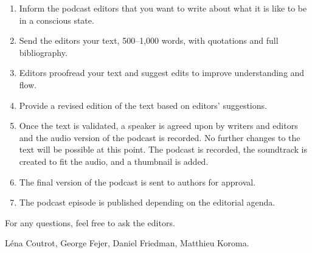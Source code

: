 \documentclass[11pt]{article}
\begin{document}
\begin{enumerate}
\item Inform the podcast editors that you want to write about what it is like to be in a conscious state.
\item Send the editors your text, 500--1,000 words, with quotations and full bibliography.
\item Editors proofread your text and suggest edits to improve understanding and flow.
\item Provide a revised edition of the text based on editors' suggestions.
\item Once the text is validated, a speaker is agreed upon by writers and editors and the audio version of the podcast is recorded. No further changes to the text will be possible at this point. The podcast is recorded, the soundtrack is created to fit the audio, and a thumbnail is added.
\item The final version of the podcast is sent to authors for approval.
\item The podcast episode is published depending on the editorial agenda.
\end{enumerate}


For any questions, feel free to ask the editors.

L\'ena Coutrot, George Fejer, Daniel Friedman, Matthieu Koroma.
\end{document}
